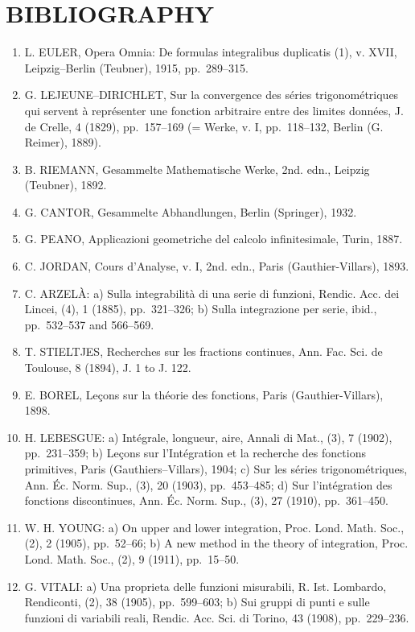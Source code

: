 \chapter*{BIBLIOGRAPHY}
{}

\begin{enumerate}
\def\labelenumi{(\Roman{enumi})}
\item
  L. EULER, Opera Omnia: De formulas integralibus duplicatis (1), v. XVII, Leipzig--Berlin (Teubner), 1915, pp.~289--315.
\item
  G. LEJEUNE--DIRICHLET, Sur la convergence des séries trigonométriques qui servent à représenter une fonction arbitraire entre des limites données, J. de Crelle, 4 (1829), pp.~157--169 (= Werke, v. I, pp.~118--132, Berlin (G. Reimer), 1889).
\item
  B. RIEMANN, Gesammelte Mathematische Werke, 2nd. edn., Leipzig (Teubner), 1892.
\item
  G. CANTOR, Gesammelte Abhandlungen, Berlin (Springer), 1932.
\item
  G. PEANO, Applicazioni geometriche del calcolo infinitesimale, Turin, 1887.
\item
  C. JORDAN, Cours d'Analyse, v. I, 2nd. edn., Paris (Gauthier-Villars), 1893.
\item
  C. ARZELÀ: a) Sulla integrabilità di una serie di funzioni, Rendic. Acc. dei Lincei, (4), 1 (1885), pp.~321--326; b) Sulla integrazione per serie, ibid., pp.~532--537 and 566--569.
\item
  T. STIELTJES, Recherches sur les fractions continues, Ann. Fac. Sci. de Toulouse, 8 (1894), J. 1 to J. 122.
\item
  E. BOREL, Leçons sur la théorie des fonctions, Paris (Gauthier-Villars), 1898.
\item
  H. LEBESGUE: a) Intégrale, longueur, aire, Annali di Mat., (3), 7 (1902), pp.~231--359; b) Leçons sur l'Intégration et la recherche des fonctions primitives, Paris (Gauthiers--Villars), 1904; c) Sur les séries trigonométriques, Ann. Éc. Norm. Sup., (3), 20 (1903), pp.~453--485; d) Sur l'intégration des fonctions discontinues, Ann. Éc. Norm. Sup., (3), 27 (1910), pp.~361--450.
\item
  W. H. YOUNG: a) On upper and lower integration, Proc. Lond. Math. Soc., (2), 2 (1905), pp.~52--66; b) A new method in the theory of integration, Proc. Lond. Math. Soc., (2), 9 (1911), pp.~15--50.
\item
  G. VITALI: a) Una proprieta delle funzioni misurabili, R. Ist. Lombardo, Rendiconti, (2), 38 (1905), pp.~599--603; b) Sui gruppi di punti e sulle funzioni di variabili reali, Rendic. Acc. Sci. di Torino, 43 (1908), pp.~229--236.

\end{enumerate}
